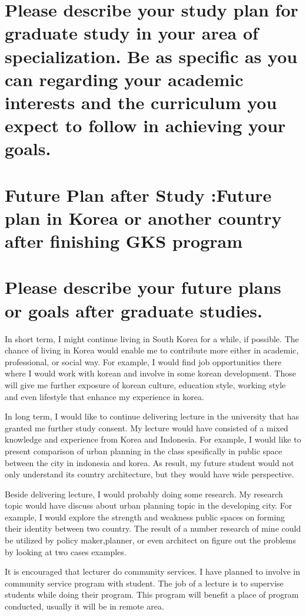 \documentclass[12pt]{simart} %
\begin{document}
\section*{Please describe your study plan for graduate study in your area of specialization. Be as specific as you can regarding your academic interests and the curriculum you expect to follow in achieving your goals.}

\section{Future Plan after Study :Future plan in Korea or another country after finishing GKS program}
\section*{Please describe your future plans or goals after graduate studies.}

In short term, I might continue living in South Korea for a while, if possible.  The chance of living in Korea would enable me to contribute more either in academic, professional, or social way. For example, I would find job opportunities there where I would work with korean and involve in some korean development. Those will give me further exposure of korean culture, education style, working style and even lifestyle that enhance my experience in korea.

In long term, I would like to continue delivering lecture in the university that has granted me further study consent. My lecture would have consisted of a mixed knowledge and experience from Korea and Indonesia. For example, I would like to present comparison of urban planning in the class spesifically in public space between the city in indonesia and korea. As result, my future student would not only understand its country architecture, but they would have wide perspective.

Beside delivering lecture, I would probably doing some research. My research topic would have discuss about urban planning topic in the developing city. For example, I would explore the strength and weakness public spaces on forming their identity between two country. The result of a number research of mine could be utilized by policy maker,planner, or even architect on figure out the problems by looking at two cases examples.

It is encouraged that lecturer do community services. I have planned to involve in community service program with student. The job of a lecture is to supervise students while doing their program. This program will benefit a place of program conducted, usually it will be in remote area.


%

%
\end{document}
